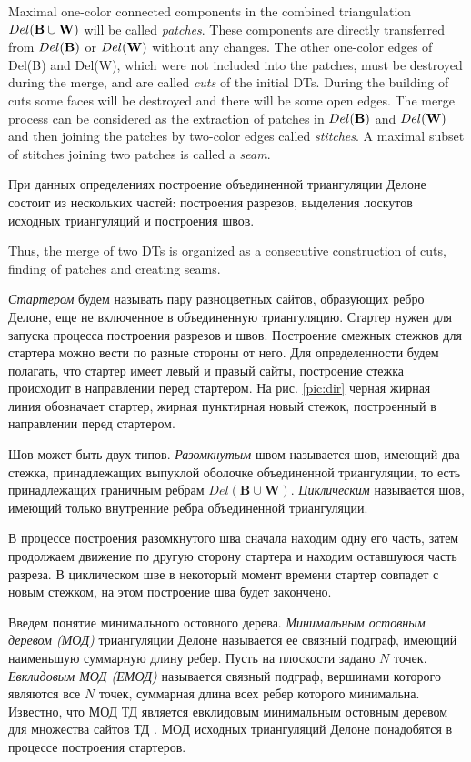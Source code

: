 \documentclass[12pt]{article}
\begin{document}
Maximal one-color connected components in the combined triangulation $Del(\bf{B} \cup \bf{W})$ will be called {\it patches}.
These components are directly transferred from $Del(\bf{B})$ or $Del(\bf{W})$ without any changes.
The other one-color edges of Del(B) and Del(W), which were not included into the patches, must be destroyed during the merge, and are called {\it cuts} of the initial DTs.
During the building of cuts some faces will be destroyed and there will be some open edges.
The merge process can be considered as the extraction of patches in $Del(\bf{B})$ and $Del(\bf{W})$ and then joining the patches by two-color edges called {\it stitches}.
A maximal subset of stitches joining two patches is called a {\it seam}. 

{\color{green}
При данных определениях построение объединенной триангуляции Делоне состоит из нескольких частей: построения разрезов,
выделения лоскутов исходных триангуляций и построения швов.
}

Thus, the merge of two DTs is organized as a consecutive construction of cuts, finding of patches and creating seams.

{\it Стартером} будем называть пару разноцветных сайтов, образующих ребро Делоне,
еще не включенное в объединенную триангуляцию.
Стартер нужен для запуска процесса построения разрезов и швов.
Построение смежных стежков для стартера можно вести по разные стороны от него.
Для определенности будем полагать, что стартер имеет левый и правый сайты,
построение стежка происходит в направлении перед стартером.
На рис. \ref{pic:dir} черная жирная линия обозначает стартер, жирная пунктирная новый стежок, построенный в направлении перед стартером.

Шов может быть двух типов.
{\it Разомкнутым} швом называется шов, имеющий два стежка, принадлежащих выпуклой оболочке объединенной триангуляции,
то есть принадлежащих граничным ребрам $Del(\textbf{B} \cup \textbf{W})$.
{\it Циклическим} называется шов, имеющий только внутренние ребра объединенной триангуляции.

В процессе построения разомкнутого шва сначала находим одну его часть,
затем продолжаем движение по другую сторону стартера и находим оставшуюся часть разреза.
В циклическом шве в некоторый момент времени стартер совпадет с новым стежком,
на этом построение шва будет закончено.

Введем понятие минимального остовного дерева.
{\it Минимальным остовным деревом (МОД)} триангуляции Делоне называется ее связный подграф,
имеющий наименьшую суммарную длину ребер.
Пусть на плоскости задано $N$ точек.
{\it Евклидовым МОД (ЕМОД)} называется связный подграф,
вершинами которого являются все $N$ точек, суммарная длина всех ребер которого минимальна.
Известно, что МОД ТД является евклидовым минимальным остовным деревом для множества сайтов ТД \cite[стр. 229, 277]{Preparata}.
МОД исходных триангуляций Делоне понадобятся в процессе построения стартеров.
\end{document}
